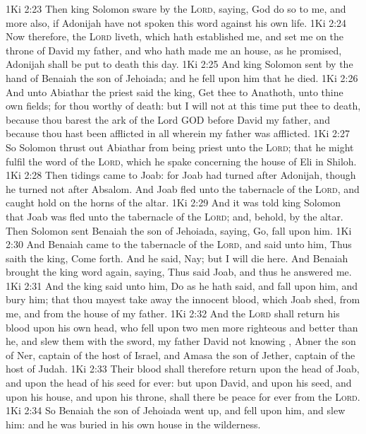 \vs 1Ki 2:23 Then king Solomon sware by the \textsc{Lord}, saying, God do so to me, and more also, if Adonijah have not spoken this word against his own life.
\vs 1Ki 2:24 Now therefore,  the \textsc{Lord} liveth, which hath established me, and set me on the throne of David my father, and who hath made me an house, as he promised, Adonijah shall be put to death this day.
\vs 1Ki 2:25 And king Solomon sent by the hand of Benaiah the son of Jehoiada; and he fell upon him that he died.
\vs 1Ki 2:26 And unto Abiathar the priest said the king, Get thee to Anathoth, unto thine own fields; for thou  worthy of death: but I will not at this time put thee to death, because thou barest the ark of the Lord GOD before David my father, and because thou hast been afflicted in all wherein my father was afflicted.
\vs 1Ki 2:27 So Solomon thrust out Abiathar from being priest unto the \textsc{Lord}; that he might fulfil the word of the \textsc{Lord}, which he spake concerning the house of Eli in Shiloh.
\vs 1Ki 2:28 Then tidings came to Joab: for Joab had turned after Adonijah, though he turned not after Absalom. And Joab fled unto the tabernacle of the \textsc{Lord}, and caught hold on the horns of the altar.
\vs 1Ki 2:29 And it was told king Solomon that Joab was fled unto the tabernacle of the \textsc{Lord}; and, behold,  by the altar. Then Solomon sent Benaiah the son of Jehoiada, saying, Go, fall upon him.
\vs 1Ki 2:30 And Benaiah came to the tabernacle of the \textsc{Lord}, and said unto him, Thus saith the king, Come forth. And he said, Nay; but I will die here. And Benaiah brought the king word again, saying, Thus said Joab, and thus he answered me.
\vs 1Ki 2:31 And the king said unto him, Do as he hath said, and fall upon him, and bury him; that thou mayest take away the innocent blood, which Joab shed, from me, and from the house of my father.
\vs 1Ki 2:32 And the \textsc{Lord} shall return his blood upon his own head, who fell upon two men more righteous and better than he, and slew them with the sword, my father David not knowing , Abner the son of Ner, captain of the host of Israel, and Amasa the son of Jether, captain of the host of Judah.
\vs 1Ki 2:33 Their blood shall therefore return upon the head of Joab, and upon the head of his seed for ever: but upon David, and upon his seed, and upon his house, and upon his throne, shall there be peace for ever from the \textsc{Lord}.
\vs 1Ki 2:34 So Benaiah the son of Jehoiada went up, and fell upon him, and slew him: and he was buried in his own house in the wilderness.
